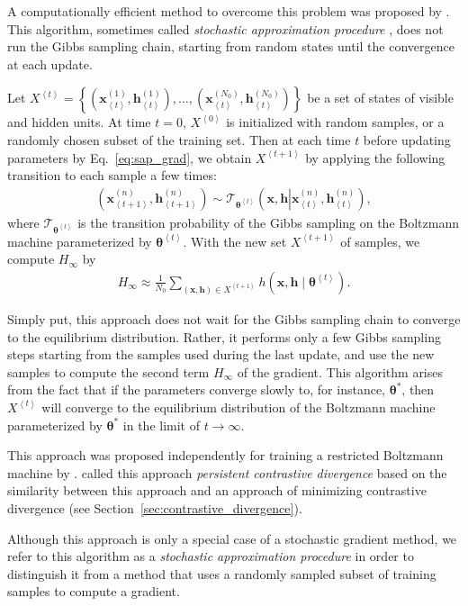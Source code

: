 \documentclass[dissertation,nocontribution]{aaltoseries}
\newcommand{\qt}[1]{\left<#1\right>}
\newcommand{\vect}[1]{\mathbf{#1}}
\newcommand{\vects}[1]{\boldsymbol{#1}}
\newcommand{\vh}[0]{\vect{h}}
\newcommand{\vx}[0]{\vect{x}}
\newcommand{\TT}[0]{{\vects{\theta}}}
\newcommand{\T}[0]{\mathcal{T}}
\begin{document}
A computationally efficient method to overcome this problem
was proposed by \citet{Younes1988}. This algorithm, sometimes
called \textit{stochastic approximation procedure}
\citep{Salakhutdinov2009}, does not run the Gibbs
sampling chain, starting from random states until the
convergence at each update.

Let $X^{\qt{t}} = \left\{ \left(\vx_{\qt{t}}^{(1)},
\vh_{\qt{t}}^{(1)}\right),
\dots, \left(\vx_{\qt{t}}^{(N_0)}, \vh_{\qt{t}}^{(N_0)}\right)\right\}$ be
a set of states of visible and hidden units. At time $t=0$,
$X^{\qt{0}}$ is initialized with random samples, or a randomly
chosen subset of the training set. Then at each time $t$ 
before updating parameters by
Eq.~\eqref{eq:sap_grad}, we obtain
$X^{\qt{t+1}}$ by applying the following transition to each
sample a few times:
\begin{align*}
    \left( \vx_{\qt{t+1}}^{(n)}, \vh_{\qt{t+1}}^{(n)}\right) \sim
    \T_{\TT^{\qt{t}}} \left(\vx, \vh \left| \vx_{\qt{t}}^{(n)},
    \vh_{\qt{t}}^{(n)}\right.\right),
\end{align*}
where $\T_{\TT^{\qt{t}}}$ is the transition probability of the
Gibbs sampling on the Boltzmann machine parameterized by
$\TT^{\qt{t}}$. With the new set $X^{\qt{t+1}}$ of samples, we compute
$H_\infty$ by
\begin{align*}
    H_\infty \approx \frac{1}{N_0} \sum_{(\vx, \vh) \in
    X^{\qt{t+1}}}
    h\left(\vx, \vh \mid \TT^{\qt{t}}\right).
\end{align*}

Simply put, this approach does not wait for the Gibbs
sampling chain to converge to the equilibrium distribution.
Rather, it performs only a few Gibbs sampling steps starting
from the samples used during the last update, and use the
new samples to compute the second term $H_\infty$ of the
gradient. This algorithm arises from the fact that if the
parameters converge slowly to, for instance, $\TT^*$, then
$X^{\qt{t}}$ will converge to the equilibrium distribution of the
Boltzmann machine parameterized by $\TT^*$ in the limit of
$t \to \infty$.

This approach was proposed independently for
training a restricted Boltzmann machine by
\citet{Tieleman2008}.  \citet{Tieleman2008} called this
approach \textit{persistent contrastive divergence} based on
the similarity between this approach and an approach of
minimizing contrastive divergence (see
Section~\ref{sec:contrastive_divergence}).

Although this approach is only a special case of a
stochastic gradient method, we refer to this algorithm as a
\textit{stochastic approximation procedure} in order to
distinguish it from a method that uses a randomly sampled
subset of training samples to compute a gradient.
\end{document}
